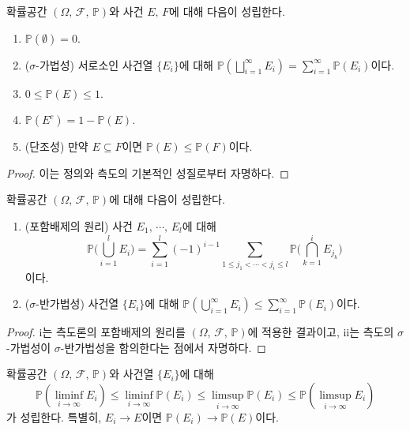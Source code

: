\begin{theorem}
    확률공간 $(\Omega,\,\mathcal{F},\,\mathbb{P})$와 사건 $E,\,F$에 대해 다음이 성립한다.
    \begin{enumerate}
        \item $\mathbb{P}(\emptyset)=0$.
        \item ($\sigma$-가법성) 서로소인 사건열 $\{E_i\}$에 대해 $\mathbb{P}(\bigsqcup_{i=1}^\infty E_i)=\sum_{i=1}^\infty\mathbb{P}(E_i)$이다.
        \item $0\leq\mathbb{P}(E)\leq1$.
        \item $\mathbb{P}(E^c)=1-\mathbb{P}(E)$.
        \item (단조성) 만약 $E\subseteq F$이면 $\mathbb{P}(E)\leq\mathbb{P}(F)$이다.
    \end{enumerate}
\end{theorem}

\begin{proof}
    이는 정의와 측도의 기본적인 성질로부터 자명하다.
\end{proof}

\begin{theorem}
    확률공간 $(\Omega,\,\mathcal{F},\,\mathbb{P})$에 대해 다음이 성립한다.
    \begin{enumerate}
        \item (포함배제의 원리) 사건 $E_1,\,\cdots,\,E_l$에 대해
        \begin{equation*}
            \mathbb{P}\bigg(\bigcup_{i=1}^lE_i\bigg)=\sum_{i=1}^l(-1)^{i-1}\sum_{1\leq j_1<\cdots<j_i\leq l}\mathbb{P}\bigg(\bigcap_{k=1}^i E_{j_k}\bigg)
        \end{equation*}
        이다.
        \item ($\sigma$-반가법성) 사건열 $\{E_i\}$에 대해 $\mathbb{P}(\bigcup_{i=1}^\infty E_i)\leq\sum_{i=1}^\infty\mathbb{P}(E_i)$이다.
    \end{enumerate}
\end{theorem}

\begin{proof}
    i는 측도론의 포함배제의 원리를 $(\Omega,\,\mathcal{F},\,\mathbb{P})$에 적용한 결과이고, ii는 측도의 $\sigma$-가법성이 $\sigma$-반가법성을 함의한다는 점에서 자명하다.
\end{proof}

\begin{theorem}
    확률공간 $(\Omega,\,\mathcal{F},\,\mathbb{P})$와 사건열 $\{E_i\}$에 대해 
    \begin{equation*}
        \mathbb{P}(\liminf_{i\to\infty}E_i)\leq\liminf_{i\to\infty}\mathbb{P}(E_i)\leq\limsup_{i\to\infty}\mathbb{P}(E_i)\leq\mathbb{P}(\limsup_{i\to\infty}E_i)
    \end{equation*}
    가 성립한다. 특별히, $E_i\to E$이면 $\mathbb{P}(E_i)\to\mathbb{P}(E)$이다.
\end{theorem}

